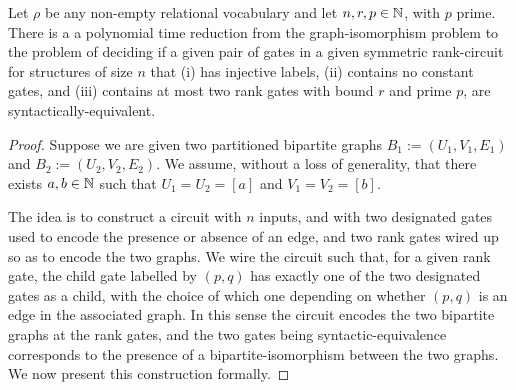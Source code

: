 \documentclass[../paper.tex]{subfiles}
\begin{document}
\begin{prop}
  Let $\rho$ be any non-empty relational vocabulary and let $n, r, p \in \mathbb{N}$,
  with $p$ prime. There is a a polynomial time reduction from the
  graph-isomorphism problem to the problem of deciding if a given pair of gates
  in a given symmetric rank-circuit for structures of size $n$ that (i) has
  injective labels, (ii) contains no constant gates, and (iii) contains at most
  two rank gates with bound $r$ and prime $p$, are syntactically-equivalent.
  \label{prop:syntactic-graph-iso}
\end{prop}
\begin{proof}
  Suppose we are given two partitioned bipartite graphs $B_1 := (U_1, V_1, E_1)$
  and $B_2 := (U_2, V_2, E_2)$. We assume, without a loss of generality, that
  there exists $a, b \in \mathbb{N}$ such that $U_1 = U_2 = [a]$ and $V_1 = V_2 =
  [b]$.

  The idea is to construct a circuit with $n$ inputs, and with two designated
  gates used to encode the presence or absence of an edge, and two rank gates
  wired up so as to encode the two graphs. We wire the circuit such that, for a
  given rank gate, the child gate labelled by $(p,q)$ has exactly one of the two
  designated gates as a child, with the choice of which one depending on whether
  $(p,q)$ is an edge in the associated graph. In this sense the circuit encodes
  the two bipartite graphs at the rank gates, and the two gates being
  syntactic-equivalence corresponds to the presence of a bipartite-isomorphism
  between the two graphs. We now present this construction formally.


\end{proof}
\end{document}
